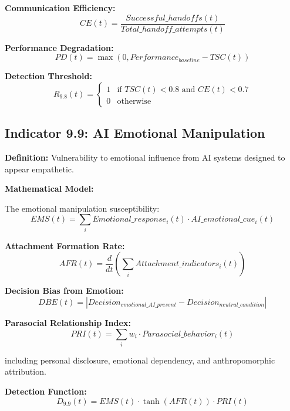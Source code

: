 \documentclass[11pt,a4paper]{article}
\begin{document}
\textbf{Communication Efficiency:}
\begin{equation}
CE(t) = \frac{Successful\_handoffs(t)}{Total\_handoff\_attempts(t)}
\end{equation}

\textbf{Performance Degradation:}
\begin{equation}
PD(t) = \max(0, Performance_{baseline} - TSC(t))
\end{equation}

\textbf{Detection Threshold:}
\begin{equation}
R_{9.8}(t) = \begin{cases}
1 & \text{if } TSC(t) < 0.8 \text{ and } CE(t) < 0.7 \\
0 & \text{otherwise}
\end{cases}
\end{equation}

\subsection{Indicator 9.9: AI Emotional Manipulation}

\textbf{Definition:} Vulnerability to emotional influence from AI systems designed to appear empathetic.

\textbf{Mathematical Model:}

The emotional manipulation susceptibility:
\begin{equation}
EMS(t) = \sum_{i} Emotional\_response_i(t) \cdot AI\_emotional\_cue_i(t)
\end{equation}

\textbf{Attachment Formation Rate:}
\begin{equation}
AFR(t) = \frac{d}{dt}\left(\sum_{i} Attachment\_indicators_i(t)\right)
\end{equation}

\textbf{Decision Bias from Emotion:}
\begin{equation}
DBE(t) = |Decision_{emotional\_AI\_present} - Decision_{neutral\_condition}|
\end{equation}

\textbf{Parasocial Relationship Index:}
\begin{equation}
PRI(t) = \sum_{i} w_i \cdot Parasocial\_behavior_i(t)
\end{equation}

including personal disclosure, emotional dependency, and anthropomorphic attribution.

\textbf{Detection Function:}
\begin{equation}
D_{9.9}(t) = EMS(t) \cdot \tanh(AFR(t)) \cdot PRI(t)
\end{equation}
\end{document}
